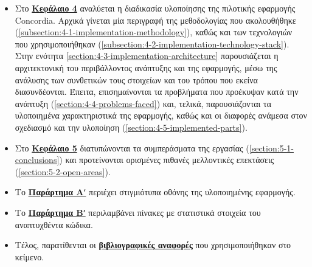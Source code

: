 \begin{itemize}
	\item Στο \hyperref[chapter:4-application-implementation]{\textbf{Κεφάλαιο 4}} αναλύεται η διαδικασία υλοποίησης της πιλοτικής εφαρμογής Concordia. Αρχικά γίνεται μία περιγραφή της μεθοδολογίας που ακολουθήθηκε (\ref{subsection:4-1-implementation-methodology}), καθώς και των τεχνολογιών που χρησιμοποιήθηκαν (\ref{subsection:4-2-implementation-technology-stack}). Στην ενότητα \ref{section:4-3-implementation-architecture} παρουσιάζεται η αρχιτεκτονική του περιβάλλοντος ανάπτυξης και της εφαρμογής, μέσω της ανάλυσης των συνθετικών τους στοιχείων και του τρόπου που εκείνα διασυνδέονται. Έπειτα, επισημαίνονται τα προβλήματα που προέκυψαν κατά την ανάπτυξη (\ref{section:4-4-problems-faced}) και, τελικά, παρουσιάζονται τα υλοποιημένα χαρακτηριστικά της εφαρμογής, καθώς και οι διαφορές ανάμεσα στον σχεδιασμό και την υλοποίηση (\ref{section:4-5-implemented-parts}).
	\item Στο \hyperref[chapter:5-conclusions-open-areas]{\textbf{Κεφάλαιο 5}} διατυπώνονται τα συμπεράσματα της εργασίας (\ref{section:5-1-conclusions}) και προτείνονται ορισμένες πιθανές μελλοντικές επεκτάσεις (\ref{section:5-2-open-areas}).
	\item Το \hyperref[{appendix-a}]{\textbf{Παράρτημα Αʹ}} περιέχει στιγμιότυπα οθόνης της υλοποιημένης εφαρμογής.
	\item Το \hyperref[{appendix-b}]{\textbf{Παράρτημα Βʹ}} περιλαμβάνει πίνακες με στατιστικά στοιχεία του αναπτυχθέντα κώδικα.
	\item Τέλος, παρατίθενται οι \hyperref[{bibliography}]{\textbf{βιβλιογραφικές αναφορές}} που χρησιμοποιήθηκαν στο κείμενο.
\end{itemize}
